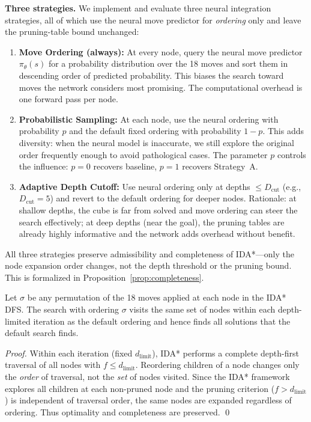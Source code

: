 \documentclass[10pt,twocolumn,a4paper]{article}
\begin{document}
\textbf{Three strategies.} We implement and evaluate three neural integration strategies, all of which use the neural move predictor for \emph{ordering} only and leave the pruning-table bound unchanged:

\begin{enumerate}[leftmargin=*]
  \item[\textbf{(A)}] \textbf{Move Ordering (always):} At every node, query the neural move predictor $\pi_\theta(s)$ for a probability distribution over the 18 moves and sort them in descending order of predicted probability. This biases the search toward moves the network considers most promising. The computational overhead is one forward pass per node.
  \item[\textbf{(B)}] \textbf{Probabilistic Sampling:} At each node, use the neural ordering with probability $p$ and the default fixed ordering with probability $1-p$. This adds diversity: when the neural model is inaccurate, we still explore the original order frequently enough to avoid pathological cases. The parameter $p$ controls the influence: $p=0$ recovers baseline, $p=1$ recovers Strategy~A.
  \item[\textbf{(C)}] \textbf{Adaptive Depth Cutoff:} Use neural ordering only at depths $\leq D_{\mathrm{cut}}$ (e.g., $D_{\mathrm{cut}} = 5$) and revert to the default ordering for deeper nodes. Rationale: at shallow depths, the cube is far from solved and move ordering can steer the search effectively; at deep depths (near the goal), the pruning tables are already highly informative and the network adds overhead without benefit.
\end{enumerate}

All three strategies preserve admissibility and completeness of IDA*---only the node expansion order changes, not the depth threshold or the pruning bound. This is formalized in Proposition~\ref{prop:completeness}.

\begin{proposition}
\label{prop:completeness}
Let $\sigma$ be any permutation of the 18 moves applied at each node in the IDA* DFS. The search with ordering $\sigma$ visits the same set of nodes within each depth-limited iteration as the default ordering and hence finds all solutions that the default search finds.
\end{proposition}

\begin{proof}
Within each iteration (fixed $d_{\text{limit}}$), IDA* performs a complete depth-first traversal of all nodes with $f \leq d_{\text{limit}}$. Reordering children of a node changes only the \emph{order} of traversal, not the \emph{set} of nodes visited. Since the IDA* framework explores all children at each non-pruned node and the pruning criterion ($f > d_{\text{limit}}$) is independent of traversal order, the same nodes are expanded regardless of ordering. Thus optimality and completeness are preserved. \qed
\end{proof}
\end{document}
